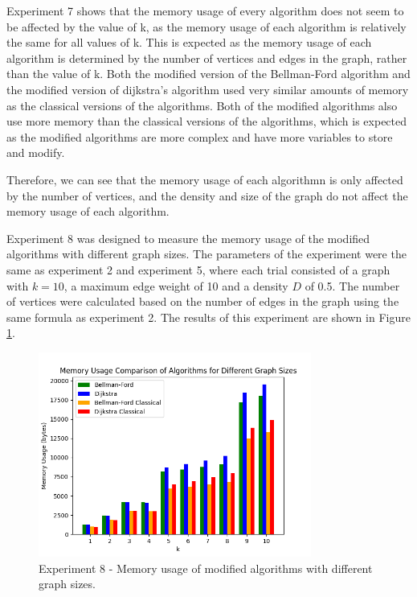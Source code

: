 \documentclass[12pt]{article}
\begin{document}
Experiment 7 shows that the memory usage of every algorithm does not seem to be affected by the value of k, as the 
memory usage of each algorithm is relatively the same for all values of k. This is expected as the memory usage of each algorithm is determined by the number of vertices and edges in the graph, rather than the value of k.
Both the modified version of the Bellman-Ford algorithm and the modified version of dijkstra's algorithm used very similar amounts of memory as the classical versions of the algorithms.
Both of the modified algorithms also use more memory than the classical versions of the algorithms,
which is expected as the modified algorithms are more complex and have more variables to store and modify.
\smallskip
\newline
\indent

Therefore, we can see that the memory usage of each algorithmn is only affected by the number of vertices, and the density and size of the graph do not affect the memory usage of each algorithm.

Experiment 8 was designed to measure the memory usage of the modified algorithms with different graph sizes. The parameters of the experiment were the same as experiment 2 and experiment 5, where each trial consisted of a graph with $k=10$, a maximum edge weight of 10 and a density $D$ of 0.5. The number of vertices were calculated based on the number of edges in the graph using the same formula as experiment 2.
The results of this experiment are shown in Figure \ref{fig:Figure 8}.

\begin{figure}[H] 
    \centering
    \includegraphics[width=0.8\textwidth]{Figures/Memory_sizes.png} 
    \caption{\footnotesize Experiment 8 - Memory usage of modified algorithms with different graph sizes.}
    \label{fig:Figure 8} 
\end{figure}
\end{document}

